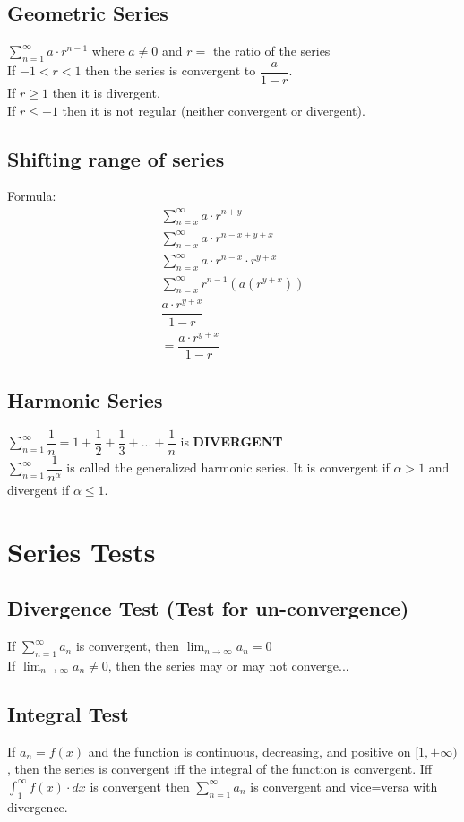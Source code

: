 \documentclass{article}
\begin{document}
\subsection*{Geometric Series}
$\displaystyle \sum^\infty_{n=1}a \cdot r^{n-1}$ where $a\not= 0$ and $r=$ the ratio of the series\\
If $-1<r<1$ then the series is convergent to $\dfrac{a}{1-r}$.\\
If $r\ge 1$ then it is divergent.\\
If $r\le -1$ then it is not regular (neither convergent or divergent).
\subsection*{Shifting range of series}
Formula:
\begin{equation}
\begin{aligned}
\sum^\infty_{n=x}a \cdot r^{n+y}\\
\sum^\infty_{n=x}a \cdot r^{n-x+y+x}\\
\sum^\infty_{n=x}a \cdot r^{n-x} \cdot r^{y+x}\\
\sum^\infty_{n=x}r^{n-1}(a(r^{y+x}))\\
\dfrac{a \cdot r^{y+x}}{1-r}\\
=\dfrac{a \cdot r^{y+x}}{1-r}
\end{aligned}
\end{equation}
\subsection*{Harmonic Series}
$\displaystyle \sum^\infty_{n=1}\dfrac{1}{n}=1+\dfrac{1}{2}+\dfrac{1}{3}+...+\dfrac{1}{n}$  is \textbf{DIVERGENT}\\
$\displaystyle \sum^\infty_{n=1}\dfrac{1}{n^\alpha}$ is called the generalized harmonic series. It is convergent if $\alpha >1$ and divergent if $\alpha\le 1$.
\section{Series Tests}
\subsection*{Divergence Test (Test for un-convergence)}
If $\displaystyle \sum^\infty_{n=1}a_n$ is convergent, then $\displaystyle \lim_{n\to\infty}a_n=0$\\
If $\displaystyle \lim_{n\to\infty}a_n\not= 0$, then the series may or may not converge...
\subsection*{Integral Test}
If $a_n=f(x)$ and the function is continuous, decreasing, and positive on $[1,+\infty)$, then the series is convergent iff the integral of the function is convergent. Iff $\int^\infty_1 f(x) \cdot dx$ is convergent then $\displaystyle \sum^\infty_{n=1}a_n$ is convergent and vice=versa with divergence.
\end{document}
